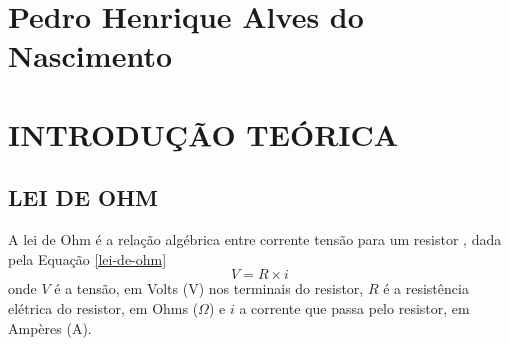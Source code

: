 \documentclass[12pt]{article}
\begin{document}
    
    
    \listoftables
    \thispagestyle{empty}
    \newpage

    \listoffigures
    \thispagestyle{empty}
    \newpage

    \tableofcontents
    \thispagestyle{empty}
    \newpage

    \section*{Pedro Henrique Alves do Nascimento}
    \section{INTRODUÇÃO TEÓRICA}
    \subsection{LEI DE OHM}\indent
    
    A lei de Ohm é a relação algébrica entre corrente tensão para um resistor \parencite{nilsson}, dada pela Equação \ref{lei-de-ohm}
    \begin{equation}
        V=R\times i \label{lei-de-ohm}
    \end{equation}
    onde $V$ é a tensão, em Volts (V) nos terminais do resistor, $R$ é a resistência elétrica do resistor, em Ohms ($\Omega$) e $i$ a corrente que passa pelo resistor, em Ampères (A).
\end{document}
